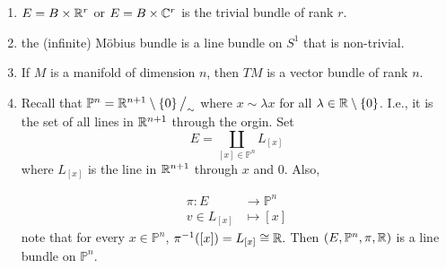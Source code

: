 \documentclass[main.tex]{subfiles}
\begin{document}
\begin{exmp}
\begin{enumerate}
    \item $E = B \times \mathbb{R}^r$ or $E = B \times \mathbb{C}^r$ is the trivial bundle of rank $r$.
    \item the (infinite) Möbius bundle is a line bundle on $S^1$ that is non-trivial.
    \item If $M$ is a manifold of dimension $n$, then $TM$ is a vector bundle of rank $n$.
    \item {} Recall that $\mathbb{P}^n = \mathbb{R}^{n+1} \setminus \left\{0\right\} \big/_\sim$ where $x \sim \lambda x$ for all $\lambda \in \mathbb{R}\setminus \left\{0\right\}$. I.e., it is the set of all lines in $\mathbb{R}^{n+1}$ through the orgin. Set
    \[
    E = \coprod_{[x] \in \mathbb{P}^n} L_{[x]}
    \]
    where $L_[x]$ is the line in $\mathbb{R}^{n+1}$ through $x$ and $0$. Also,

    \begin{align*}
        \pi: E &\to \mathbb{P}^n \\
             v \in L_{[x]} &\mapsto [x]
    \end{align*}
    note that for every $x \in \mathbb{P}^n$, $\pi^{-1}([x])= L_{[x]} \cong \mathbb{R}.$ Then $(E, \mathbb{P}^n, \pi, \mathbb{R})$ is a line bundle on $\mathbb{P}^n$.
\end{enumerate}
\end{exmp}
\end{document}
